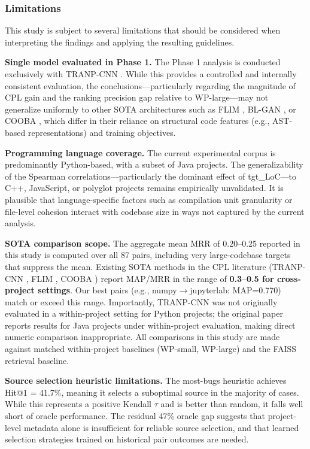 \documentclass[12pt,table,xcdraw]{article}
\begin{document}
\subsubsection{Limitations}

This study is subject to several limitations that should be considered when interpreting the findings and applying the resulting guidelines.

\textbf{Single model evaluated in Phase 1.} The Phase 1 analysis is conducted exclusively with TRANP-CNN \cite{huo2019deep}. While this provides a controlled and internally consistent evaluation, the conclusions---particularly regarding the magnitude of CPL gain and the ranking precision gap relative to WP-large---may not generalize uniformly to other SOTA architectures such as FLIM \cite{liang2022modeling}, BL-GAN \cite{zhu2022bl}, or COOBA \cite{zhu2020cooba}, which differ in their reliance on structural code features (e.g., AST-based representations) and training objectives.

\textbf{Programming language coverage.} The current experimental corpus is predominantly Python-based, with a subset of Java projects. The generalizability of the Spearman correlations---particularly the dominant effect of tgt\_LoC---to C++, JavaScript, or polyglot projects remains empirically unvalidated. It is plausible that language-specific factors such as compilation unit granularity or file-level cohesion interact with codebase size in ways not captured by the current analysis.

\textbf{SOTA comparison scope.} The aggregate mean MRR of 0.20--0.25 reported in this study is computed over all 87 pairs, including very large-codebase targets that suppress the mean. Existing SOTA methods in the CPL literature (TRANP-CNN \cite{huo2019deep}, FLIM \cite{liang2022modeling}, COOBA \cite{zhu2020cooba}) report MAP/MRR in the range of \textbf{0.3--0.5 for cross-project settings}. Our best pairs (e.g., numpy$\rightarrow$jupyterlab: MAP=0.770) match or exceed this range. Importantly, TRANP-CNN was not originally evaluated in a within-project setting for Python projects; the original paper \cite{huo2019deep} reports results for Java projects under within-project evaluation, making direct numeric comparison inappropriate. All comparisons in this study are made against matched within-project baselines (WP-small, WP-large) and the FAISS retrieval baseline.

\textbf{Source selection heuristic limitations.} The most-bugs heuristic achieves Hit@1 = 41.7\%, meaning it selects a suboptimal source in the majority of cases. While this represents a positive Kendall $\tau$ and is better than random, it falls well short of oracle performance. The residual 47\% oracle gap suggests that project-level metadata alone is insufficient for reliable source selection, and that learned selection strategies trained on historical pair outcomes are needed.
\end{document}
